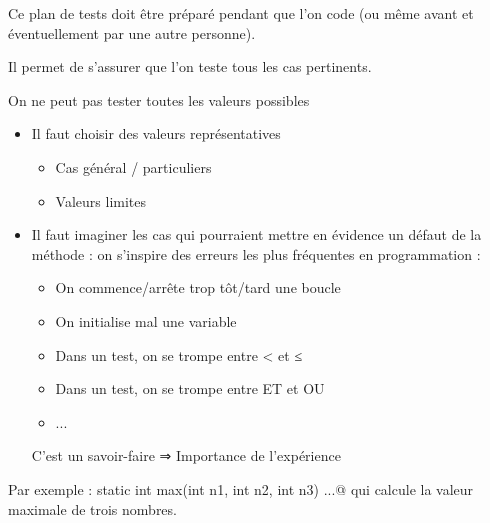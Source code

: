 \documentclass[11pt,a4paper]{article}
\begin{document}
          Ce plan de tests doit \^etre pr\'epar\'e pendant que l'on code 
          (ou m\^eme avant et \'eventuellement par une autre personne).
        
            \par
        
          Il permet de s'assurer que l'on teste tous les cas pertinents.
        
            \par
        
          On ne peut pas tester toutes les valeurs possibles
          
					\begin{itemize}
				
			\item Il faut choisir des valeurs repr\'esentatives
              
					\begin{itemize}
				
			\item Cas g\'en\'eral / particuliers
			\item Valeurs limites
					\end{itemize}
				
			\item Il faut imaginer les cas qui pourraient mettre en \'evidence un d\'efaut de la m\'ethode : 
            on s'inspire des erreurs les plus fr\'equentes en programmation :
            
					\begin{itemize}
				
			\item On commence/arr\^ete trop t\^ot/tard une boucle
			\item On initialise mal une variable
			\item Dans un test, on se trompe entre < et ≤
			\item Dans un test, on se trompe entre ET et OU
			\item ...
					\end{itemize}
				
            C'est un savoir-faire ⇒ Importance de l'exp\'erience
            
					\end{itemize}
				
            \par
        
          Par exemple : \verb@public static int max(int n1, int n2, int n3) ...@
          qui calcule la valeur maximale de trois nombres.
        
\end{document}
